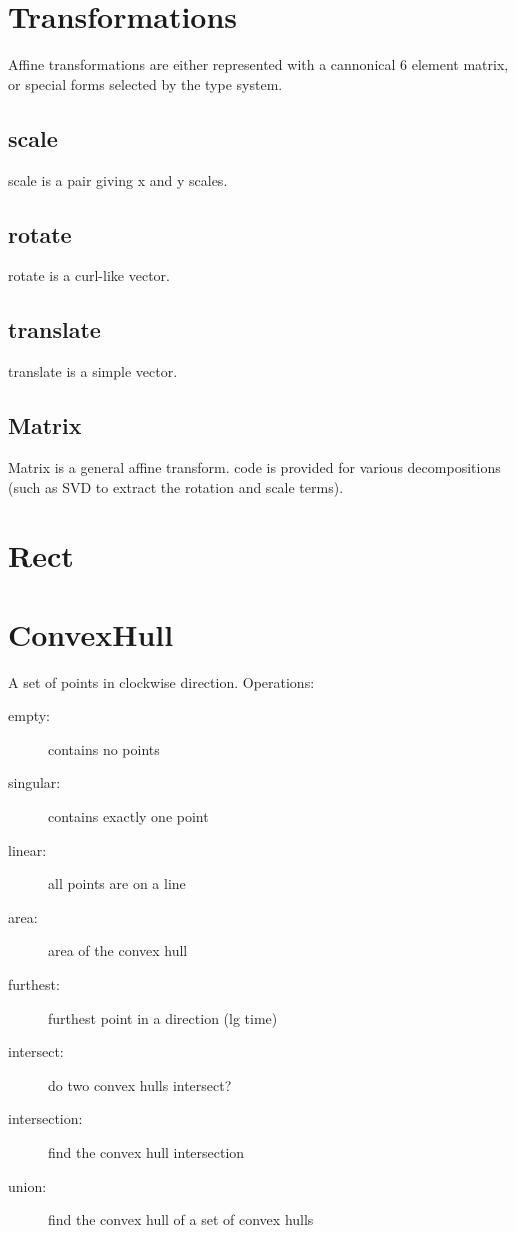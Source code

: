\section{Transformations}

Affine transformations are either represented with a cannonical 6
element matrix, or special forms selected by the type system.

\subsection{scale}

scale is a pair giving x and y scales.

\subsection{rotate}

rotate is a curl-like vector.

\subsection{translate}

translate is a simple vector.

\subsection{Matrix}

Matrix is a general affine transform.  code is provided for various
decompositions (such as SVD to extract the rotation and scale terms).

\section{Rect}

\section{ConvexHull}

A set of points in clockwise direction.  Operations:

\begin{description}
\item[empty:] contains no points
\item[singular:] contains exactly one point
\item[linear:] all points are on a line
\item[area:] area of the convex hull
\item[furthest:] furthest point in a direction (lg time)
\item[intersect:] do two convex hulls intersect?
\item[intersection:] find the convex hull intersection
\item[union:] find the convex hull of a set of convex hulls
\end{description}

